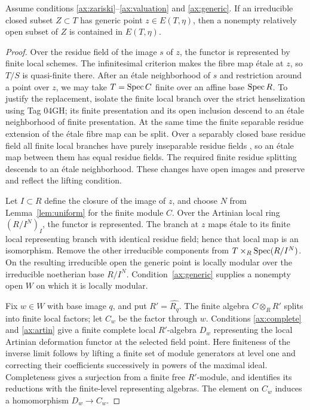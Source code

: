 \begin{lemma}\label{lem:stratum}
Assume conditions \ref{ax:zariski}--\ref{ax:valuation} and \ref{ax:generic}. If an irreducible closed subset $Z\subset T$ has generic point $z\in E(T,\eta)$, then a nonempty relatively open subset of $Z$ is contained in $E(T,\eta)$.
\end{lemma}
\begin{proof}
Over the residue field of the image $s$ of $z$, the functor is represented by finite local schemes. The infinitesimal criterion makes the fibre map \'etale at $z$, so $T/S$ is quasi-finite there. After an \'etale neighborhood of $s$ and restriction around a point over $z$, we may take $T=\operatorname{Spec} C$ finite over an affine base $\operatorname{Spec} R$. To justify the replacement, isolate the finite local branch over the strict henselization using Tag 04GH; its finite presentation and its open inclusion descend to an \'etale neighborhood of finite presentation. At the same time the finite separable residue extension of the \'etale fibre map can be split. Over a separably closed base residue field all finite local branches have purely inseparable residue fields \cite[Tag 06DD]{Stacks}, so an \'etale map between them has equal residue fields. The required finite residue splitting descends to an \'etale neighborhood. These changes have open images and preserve and reflect the lifting condition.

Let $I\subset R$ define the closure of the image of $z$, and choose $N$ from Lemma~\ref{lem:uniform} for the finite module $C$. Over the Artinian local ring $(R/I^N)_I$, the functor is represented. The branch at $z$ maps \'etale to its finite local representing branch with identical residue field; hence that local map is an isomorphism. Remove the other irreducible components from $T\times_R\operatorname{Spec}(R/I^N)$. On the resulting irreducible open the generic point is locally modular over the irreducible noetherian base $R/I^N$. Condition~\ref{ax:generic} supplies a nonempty open $W$ on which it is locally modular.

Fix $w\in W$ with base image $q$, and put $R'=\widehat{R_q}$. The finite algebra $C\otimes_RR'$ splits into finite local factors; let $C_w$ be the factor through $w$. Conditions \ref{ax:complete} and \ref{ax:artin} give a finite complete local $R'$-algebra $D_w$ representing the local Artinian deformation functor at the selected field point. Here finiteness of the inverse limit follows by lifting a finite set of module generators at level one and correcting their coefficients successively in powers of the maximal ideal. Completeness gives a surjection from a finite free $R'$-module, and identifies its reductions with the finite-level representing algebras. The element on $C_w$ induces a homomorphism $D_w\to C_w$.


\end{proof}
